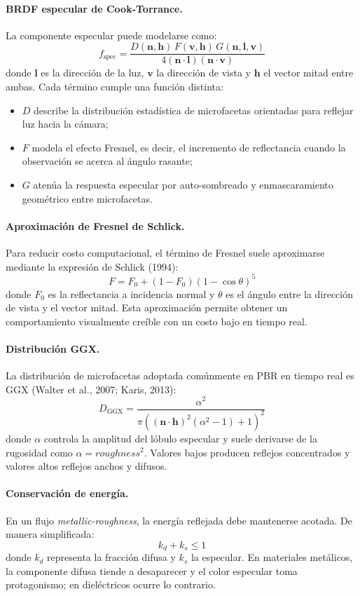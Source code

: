 \paragraph{BRDF especular de Cook-Torrance.}
La componente especular puede modelarse como:
\[
f_{\text{spec}} = \frac{D(\mathbf{n},\mathbf{h})\, F(\mathbf{v},\mathbf{h})\, G(\mathbf{n},\mathbf{l},\mathbf{v})}{4(\mathbf{n}\cdot\mathbf{l})(\mathbf{n}\cdot\mathbf{v})}
\]
donde $\mathbf{l}$ es la direcci\'on de la luz, $\mathbf{v}$ la direcci\'on de vista y $\mathbf{h}$ el vector mitad entre ambas. Cada t\'ermino cumple una funci\'on distinta:
\begin{itemize}
    \item $D$ describe la distribuci\'on estad\'istica de microfacetas orientadas para reflejar luz hacia la c\'amara;
    \item $F$ modela el efecto Fresnel, es decir, el incremento de reflectancia cuando la observaci\'on se acerca al \'angulo rasante;
    \item $G$ aten\'ua la respuesta especular por auto-sombreado y enmascaramiento geom\'etrico entre microfacetas.
\end{itemize}

\paragraph{Aproximaci\'on de Fresnel de Schlick.}
Para reducir costo computacional, el t\'ermino de Fresnel suele aproximarse mediante la expresi\'on de Schlick (1994):
\[
F = F_0 + (1 - F_0)(1 - \cos\theta)^5
\]
donde $F_0$ es la reflectancia a incidencia normal y $\theta$ es el \'angulo entre la direcci\'on de vista y el vector mitad. Esta aproximaci\'on permite obtener un comportamiento visualmente cre\'ible con un costo bajo en tiempo real.

\paragraph{Distribuci\'on GGX.}
La distribuci\'on de microfacetas adoptada com\'unmente en PBR en tiempo real es GGX (Walter et al., 2007; Karis, 2013):
\[
D_{\text{GGX}} = \frac{\alpha^2}{\pi\left((\mathbf{n}\cdot\mathbf{h})^2(\alpha^2 - 1) + 1\right)^2}
\]
donde $\alpha$ controla la amplitud del l\'obulo especular y suele derivarse de la rugosidad como $\alpha = roughness^2$. Valores bajos producen reflejos concentrados y valores altos reflejos anchos y difusos.

\paragraph{Conservaci\'on de energ\'ia.}
En un flujo \textit{metallic-roughness}, la energ\'ia reflejada debe mantenerse acotada. De manera simplificada:
\[
k_d + k_s \leq 1
\]
donde $k_d$ representa la fracci\'on difusa y $k_s$ la especular. En materiales met\'alicos, la componente difusa tiende a desaparecer y el color especular toma protagonismo; en diel\'ectricos ocurre lo contrario.

